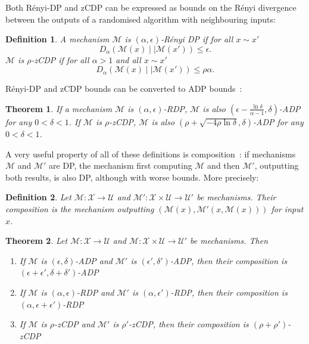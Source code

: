 \documentclass[english,twoside,openright]{HYgraduMLDS}
\newtheorem{theorem}{Theorem}
\newtheorem{definition}{Definition}
\newcommand{\dmid}{\mid\mid}
\newcommand{\calm}{{\mathcal{M}}}
\newcommand{\calx}{{\mathcal{X}}}
\newcommand{\calu}{{\mathcal{U}}}
\begin{document}
Both Rényi-DP and zCDP can be expressed as bounds on the 
Rényi divergence between the outputs of a randomised algorithm with
neighbouring inputs:

\begin{definition}
    A mechanism \(\calm\) is \((\alpha, \epsilon)\)-Rényi DP
    if for all \(x \sim x'\)
    \[
        D_\alpha(\calm(x)\dmid \calm(x')) \leq \epsilon.
    \]
    \(\calm\) is \(\rho\)-zCDP if for all \(\alpha > 1\)
    and all \(x \sim x'\)
    \[
        D_\alpha(\calm(x)\dmid \calm(x')) \leq \rho \alpha.
    \]

\end{definition}

Rényi-DP and zCDP bounds can be converted to ADP bounds~\cite{Mironov17, BuS16}:
\begin{theorem}\label{other_dp_to_adp}
    If a mechanism \(\calm\) is \((\alpha, \epsilon)\)-RDP, \(\calm\) is also
    \((\epsilon - \frac{\ln \delta}{\alpha - 1}, \delta)\)-ADP for any 
    \(0 < \delta < 1\). If \(\calm\) is \(\rho\)-zCDP, \(\calm\) is also 
    \((\rho + \sqrt{-4\rho\ln \delta}, \delta)\)-ADP for any \(0 < \delta < 1\).
\end{theorem}

A very useful property of all of these definitions is composition~\cite{DwR14}: 
if mechanisms \(\calm\) and \(\calm'\) are DP, the mechanism first computing
\(\calm\) and then \(\calm'\), outputting both results, 
is also DP, although with worse bounds.
More precisely:

\begin{definition}\label{composition_definition}
    Let \(\calm\colon \calx \to \calu\) and 
    \(\calm'\colon \calx\times \calu \to \calu'\) be mechanisms.
    Their composition is the mechanism outputting
    \((\calm(x), \calm'(x, \calm(x)))\) for input \(x\).
\end{definition}

\begin{theorem}\label{composition-theorem}
    Let \(\calm\colon \calx \to \calu\) and 
    \(\calm\colon \calx\times \calu \to \calu'\) be mechanisms. Then
    \begin{enumerate}
        \item 
            If \(\calm\) is \((\epsilon, \delta)\)-ADP and 
            \(\calm'\) is \((\epsilon', \delta')\)-ADP, then 
            their composition is 
            \((\epsilon + \epsilon', \delta + \delta')\)-ADP~\cite{DKM06}
        \item 
            If \(\calm\) is \((\alpha, \epsilon)\)-RDP and 
            \(\calm'\) is \((\alpha, \epsilon')\)-RDP, then 
            their composition is \((\alpha, \epsilon + \epsilon')\)-RDP~\cite{Mironov17}
        \item 
            If \(\calm\) is \(\rho\)-zCDP and 
            \(\calm'\) is \(\rho'\)-zCDP, then 
            their composition is \((\rho + \rho')\)-zCDP~\cite{BuS16}
    \end{enumerate}
\end{theorem}
\end{document}
